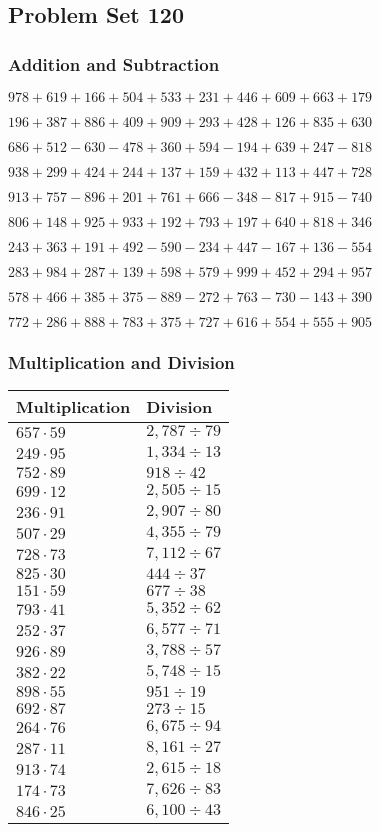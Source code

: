 \hypertarget{problem-set-120}{%
\subsection{Problem Set 120}\label{problem-set-120}}

\hypertarget{addition-and-subtraction}{%
\subsubsection{Addition and
Subtraction}\label{addition-and-subtraction}}

\(978 +619 +166 +504 +533 +231 +446 +609 +663 +179\)

\(196 +387 +886 +409 +909 +293 +428 +126 +835 +630\)

\(686 +512 - 630 - 478 +360 +594 - 194 +639 +247 - 818\)

\(938 +299 +424 +244 +137 +159 +432 +113 +447 +728\)

\(913 +757 - 896 +201 +761 +666 - 348 - 817 +915 - 740\)

\(806 +148 +925 +933 +192 +793 +197 +640 +818 +346\)

\(243 +363 +191 +492 - 590 - 234 +447 - 167 +136 - 554\)

\(283 +984 +287 +139 +598 +579 +999 +452 +294 +957\)

\(578 +466 +385 +375 - 889 - 272 +763 - 730 - 143 +390\)

\(772 +286 +888 +783 +375 +727 +616 +554 +555 +905\)

\hypertarget{multiplication-and-division}{%
\subsubsection{Multiplication and
Division}\label{multiplication-and-division}}

\begin{longtable}[]{@{}ll@{}}
\toprule
Multiplication & Division\tabularnewline
\midrule
\endhead
\(657 \cdot 59\) & \(2,787÷79\)\tabularnewline
\(249 \cdot 95\) & \(1,334÷13\)\tabularnewline
\(752 \cdot 89\) & \(918÷42\)\tabularnewline
\(699 \cdot 12\) & \(2,505÷15\)\tabularnewline
\(236 \cdot 91\) & \(2,907÷80\)\tabularnewline
\(507 \cdot 29\) & \(4,355÷79\)\tabularnewline
\(728 \cdot 73\) & \(7,112÷67\)\tabularnewline
\(825 \cdot 30\) & \(444 ÷ 37\)\tabularnewline
\(151 \cdot 59\) & \(677÷38\)\tabularnewline
\(793 \cdot 41\) & \(5,352÷62\)\tabularnewline
\(252 \cdot 37\) & \(6,577÷71\)\tabularnewline
\(926 \cdot 89\) & \(3,788÷57\)\tabularnewline
\(382 \cdot 22\) & \(5,748÷15\)\tabularnewline
\(898 \cdot 55\) & \(951÷19\)\tabularnewline
\(692 \cdot 87\) & \(273÷15\)\tabularnewline
\(264 \cdot 76\) & \(6,675÷94\)\tabularnewline
\(287 \cdot 11\) & \(8,161÷27\)\tabularnewline
\(913 \cdot 74\) & \(2,615÷18\)\tabularnewline
\(174 \cdot 73\) & \(7,626÷83\)\tabularnewline
\(846 \cdot 25\) & \(6,100÷43\)\tabularnewline
\bottomrule
\end{longtable}
